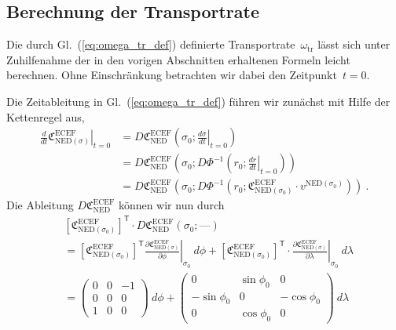 \documentclass[10pt,a4paper]{article}
\newcommand{\nul}{\textrm{---}}
\newcommand{\trans}{^\mathsf{T}}
\begin{document}
\subsection{Berechnung der Transportrate}

Die durch Gl.~(\ref{eq:omega_tr_def}) definierte Transportrate~$\omega_{\mathrm{tr}}$ lässt sich unter Zuhilfenahme der in den vorigen Abschnitten erhaltenen Formeln leicht berechnen. 
Ohne Einschränkung betrachten wir dabei den Zeitpunkt~$t=0$.

Die Zeitableitung in Gl.~(\ref{eq:omega_tr_def}) führen wir zunächst mit Hilfe der Kettenregel aus,
\begin{align}
\label{eq:dC_dt}
	\left.
	\frac{d}{dt}
	\mathfrak{C}^{\mathrm{ECEF}}_{\mathrm{NED}(\sigma)}
	\right|_{t=0}
	&=
	D\mathfrak{C}^{\mathrm{ECEF}}_{\mathrm{NED}}
	\left(
		\sigma_0;
	\left.
	\frac{d\sigma}{dt}
	\right|_{t=0}		
	\right)
	\nonumber\\
	&=
	D\mathfrak{C}^{\mathrm{ECEF}}_{\mathrm{NED}}
	\left(
		\sigma_0;
		D\Phi^{-1}\left(r_0; 	
		\left.
			\frac{dr}{dt}
		\right|_{t=0}	
		\right)		
	\right)	
	\nonumber\\
	&=
	D\mathfrak{C}^{\mathrm{ECEF}}_{\mathrm{NED}}
	\left(
		\sigma_0;
		D\Phi^{-1}\left(r_0; 	
		\mathfrak{C}^{\mathrm{ECEF}}_{\mathrm{NED}(\sigma_0)}
		\cdot
		v^{\mathrm{NED}(\sigma_0)}
		\right)		
	\right)
	\ .	
\end{align}
Die Ableitung $D\mathfrak{C}^{\mathrm{ECEF}}_{\mathrm{NED}}$ können wir nun durch
\begin{align}
\label{eq:D_C}
	&
	\left[
	\mathfrak{C}^{\mathrm{ECEF}}_{\mathrm{NED}(\sigma_0)}
	\right]\trans
	\cdot
	D\mathfrak{C}^{\mathrm{ECEF}}_{\mathrm{NED}}
	\left(
		\sigma_0;
		\nul
	\right)
	\nonumber\\
	&=
	\left[
		\mathfrak{C}^{\mathrm{ECEF}}_{\mathrm{NED}(\sigma_0)}
	\right]\trans
	\left.
	\frac{\partial \mathfrak{C}^{\mathrm{ECEF}}_{\mathrm{NED}(\sigma)}}
	{\partial\phi}
	\right|_{\sigma_0}
	\ d\phi
	+
	\left[
		\mathfrak{C}^{\mathrm{ECEF}}_{\mathrm{NED}(\sigma_0)}
	\right]\trans	
	\cdot
	\left.
	\frac{\partial \mathfrak{C}^{\mathrm{ECEF}}_{\mathrm{NED}(\sigma)}}
	{\partial\lambda}
	\right|_{\sigma_0}
	\ d\lambda
	\nonumber\\
	&=
	\begin{pmatrix}
		0 & 0 & -1\\
		0 & 0 & 0 \\
		1 & 0 & 0
	\end{pmatrix}		
	\ d\phi
	+
	\begin{pmatrix}
		0 & \sin\phi_0 & 0 \\
		-\sin\phi_0 & 0 & -\cos\phi_0 \\
		0 & \cos\phi_0 & 0
	\end{pmatrix}		
	\ d\lambda
\end{align}
\end{document}

